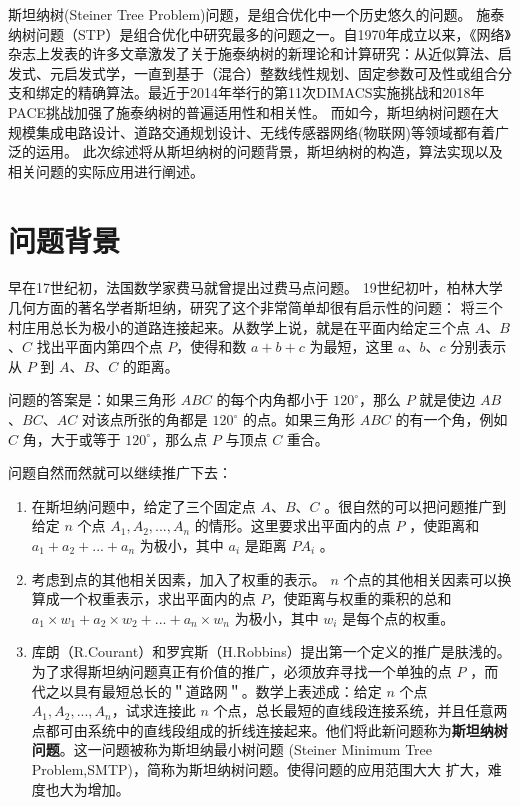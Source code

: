 \documentclass{SCIS2022cn}
\begin{document}
斯坦纳树(Steiner Tree Problem)问题，是组合优化中一个历史悠久的问题。
施泰纳树问题（STP）是组合优化中研究最多的问题之一。自1970年成立以来，《网络》杂志上发表的许多文章激发了关于施泰纳树的新理论和计算研究：从近似算法、启发式、元启发式学，一直到基于（混合）整数线性规划、固定参数可及性或组合分支和绑定的精确算法。最近于2014年举行的第11次DIMACS实施挑战和2018年PACE挑战加强了施泰纳树的普遍适用性和相关性。\cite{1}
而如今，斯坦纳树问题在大规模集成电路设计、道路交通规划设计、无线传感器网络(物联网)等领域都有着广泛的运用。
此次综述将从斯坦纳树的问题背景，斯坦纳树的构造，算法实现以及相关问题的实际应用进行阐述。


\section{问题背景}

早在17世纪初，法国数学家费马就曾提出过费马点问题。
19世纪初叶，柏林大学几何方面的著名学者斯坦纳，研究了这个非常简单却很有启示性的问题：
将三个村庄用总长为极小的道路连接起来。从数学上说，就是在平面内给定三个点 $A$、$B$、$C$ 找出平面内第四个点 $P$，使得和数 $a+b+c$ 为最短，这里 $a$、$b$、$c$ 分别表示从 $P$ 到 $A$、$B$、$C$ 的距离。

问题的答案是：如果三角形 $ABC$ 的每个内角都小于 $120^{\circ}$，那么 $P$ 就是使边 $AB$、$BC$、$AC$ 对该点所张的角都是 $120^{\circ}$ 的点。如果三角形 $ABC$ 的有一个角，例如 $C$ 角，大于或等于 $120^{\circ}$，那么点 $P$ 与顶点 $C$ 重合。

问题自然而然就可以继续推广下去\cite{3}：

\begin{enumerate}
    \item 在斯坦纳问题中，给定了三个固定点 $A$、$B$、$C$ 。很自然的可以把问题推广到给定 $n$ 个点 $A_1,A_2,...,A_n$ 的情形。这里要求出平面内的点 $P$ ，使距离和 $a_1+a_2+...+a_n$ 为极小，其中 $a_i$ 是距离 $PA_i$ 。
    \item 考虑到点的其他相关因素，加入了权重的表示。 $n$ 个点的其他相关因素可以换算成一个权重表示，求出平面内的点 $P$，使距离与权重的乘积的总和 $a_1 \times w_1+a_2 \times w_2+...+a_n \times w_n$ 为极小，其中 $w_i$ 是每个点的权重。 
    \item 库朗（R.Courant）和罗宾斯（H.Robbins）提出第一个定义的推广是肤浅的。为了求得斯坦纳问题真正有价值的推广，必须放弃寻找一个单独的点 $P$ ，而代之以具有最短总长的＂道路网＂。数学上表述成：给定 $n$ 个点 $A_1,A_2,...,A_n$，试求连接此 $n$ 个点，总长最短的直线段连接系统，并且任意两点都可由系统中的直线段组成的折线连接起来。他们将此新问题称为\textbf{斯坦纳树问题}。这一问题被称为斯坦纳最小树问题 (Steiner Minimum Tree Problem,SMTP)，简称为斯坦纳树问题。使得问题的应用范围大大 扩大，难度也大为增加。
\end{enumerate}
\end{document}
